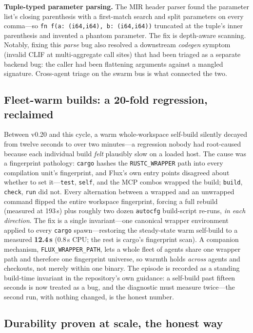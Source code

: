 \textbf{Tuple-typed parameter parsing.} The MIR header parser found the parameter list's closing parenthesis with a first-match search and split parameters on every comma---so \texttt{fn f(a: (i64,i64), b: (i64,i64))} truncated at the tuple's inner parenthesis and invented a phantom parameter. The fix is depth-aware scanning. Notably, fixing this \emph{parse} bug also resolved a downstream \emph{codegen} symptom (invalid CLIF at multi-aggregate call sites) that had been triaged as a separate backend bug: the caller had been flattening arguments against a mangled signature. Cross-agent triage on the swarm bus is what connected the two.

\subsection{Fleet-warm builds: a 20-fold regression, reclaimed}
\label{sec:warm}

Between v0.20 and this cycle, a warm whole-workspace self-build silently decayed from twelve seconds to over two minutes---a regression nobody had root-caused because each individual build \emph{felt} plausibly slow on a loaded host. The cause was a fingerprint pathology: \texttt{cargo} hashes the \texttt{RUSTC\_WRAPPER} path into every compilation unit's fingerprint, and Flux's own entry points disagreed about whether to set it---\texttt{test}, \texttt{self}, and the MCP combos wrapped the build; \texttt{build}, \texttt{check}, \texttt{run} did not. Every alternation between a wrapped and an unwrapped command flipped the entire workspace fingerprint, forcing a full rebuild (measured at 193\,s) plus roughly two dozen \texttt{autocfg} build-script re-runs, \emph{in each direction}. The fix is a single invariant---one canonical wrapper environment applied to every \texttt{cargo} spawn---restoring the steady-state warm self-build to a measured \textbf{12.4\,s} (0.8\,s CPU; the rest is cargo's fingerprint scan). A companion mechanism, \texttt{FLUX\_WRAPPER\_PATH}, lets a whole fleet of agents share one wrapper path and therefore one fingerprint universe, so warmth holds \emph{across} agents and checkouts, not merely within one binary. The episode is recorded as a standing build-time invariant in the repository's own guidance: a self-build past fifteen seconds is now treated as a bug, and the diagnostic must measure twice---the second run, with nothing changed, is the honest number.

\subsection{Durability proven at scale, the honest way}
\label{sec:durable}

